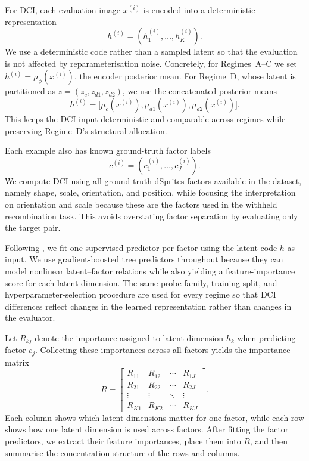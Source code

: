 For DCI, each evaluation image \(x^{(i)}\) is encoded into a deterministic representation
\[
h^{(i)}=(h^{(i)}_1,\dots,h^{(i)}_K).
\]
We use a deterministic code rather than a sampled latent so that the evaluation is not affected by reparameterisation noise. Concretely, for Regimes~A--C we set \(h^{(i)}=\mu_\phi(x^{(i)})\), the encoder posterior mean. For Regime~D, whose latent is partitioned as \(z=(z_c,z_{d1},z_{d2})\), we use the concatenated posterior means
\[
h^{(i)}=\bigl[\mu_c(x^{(i)}),\mu_{d1}(x^{(i)}),\mu_{d2}(x^{(i)})\bigr].
\]
This keeps the DCI input deterministic and comparable across regimes while preserving Regime~D's structural allocation.

Each example also has known ground-truth factor labels
\[
c^{(i)}=(c^{(i)}_1,\dots,c^{(i)}_J).
\]
We compute DCI using all ground-truth dSprites factors available in the dataset, namely shape, scale, orientation, and position, while focusing the interpretation on orientation and scale because these are the factors used in the withheld recombination task. This avoids overstating factor separation by evaluating only the target pair.

Following \citet{eastwood2018framework}, we fit one supervised predictor per factor using the latent code \(h\) as input. We use gradient-boosted tree predictors throughout because they can model nonlinear latent--factor relations while also yielding a feature-importance score for each latent dimension. The same probe family, training split, and hyperparameter-selection procedure are used for every regime so that DCI differences reflect changes in the learned representation rather than changes in the evaluator.

Let \(R_{kj}\) denote the importance assigned to latent dimension \(h_k\) when predicting factor \(c_j\). Collecting these importances across all factors yields the importance matrix
\[
R=
\begin{bmatrix}
R_{11} & R_{12} & \cdots & R_{1J}\\
R_{21} & R_{22} & \cdots & R_{2J}\\
\vdots & \vdots & \ddots & \vdots\\
R_{K1} & R_{K2} & \cdots & R_{KJ}
\end{bmatrix}.
\]
Each column shows which latent dimensions matter for one factor, while each row shows how one latent dimension is used across factors. After fitting the factor predictors, we extract their feature importances, place them into \(R\), and then summarise the concentration structure of the rows and columns.

